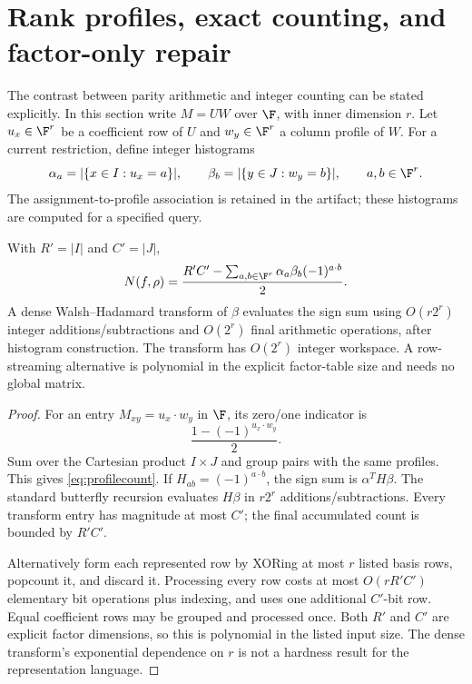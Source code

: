 \section{Rank profiles, exact counting, and factor-only repair}
\label{sec:profiles}
The contrast between parity arithmetic and integer counting can be stated explicitly. In this section write $M=UW$ over $\F$, with inner dimension $r$. Let $u_x\in\F^r$ be a coefficient row of $U$ and $w_y\in\F^r$ a column profile of $W$. For a current restriction, define integer histograms
\begin{equation}
 \alpha_a=|\{x\in I:u_x=a\}|,\qquad
 \beta_b=|\{y\in J:w_y=b\}|,\qquad a,b\in\F^r.
 \label{eq:profiles}
\end{equation}
The assignment-to-profile association is retained in the artifact; these histograms are computed for a specified query.

\begin{theorem}
\label{thm:profile}
With $R'=|I|$ and $C'=|J|$,
\begin{equation}
 N(f,\rho)=\frac{R'C'-\sum_{a,b\in\F^r}\alpha_a\beta_b(-1)^{a\cdot b}}{2}.
 \label{eq:profilecount}
\end{equation}
A dense Walsh--Hadamard transform of $\beta$ evaluates the sign sum using $O(r2^r)$ integer additions/subtractions and $O(2^r)$ final arithmetic operations, after histogram construction. The transform has $O(2^r)$ integer workspace. A row-streaming alternative is polynomial in the explicit factor-table size and needs no global matrix.
\end{theorem}
\begin{proof}
For an entry $M_{xy}=u_x\cdot w_y$ in $\F$, its zero/one indicator is
\[
 \frac{1-(-1)^{u_x\cdot w_y}}2.
\]
Sum over the Cartesian product $I\times J$ and group pairs with the same profiles. This gives \eqref{eq:profilecount}. If $H_{ab}=(-1)^{a\cdot b}$, the sign sum is $\alpha^T H\beta$. The standard butterfly recursion evaluates $H\beta$ in $r2^r$ additions/subtractions. Every transform entry has magnitude at most $C'$; the final accumulated count is bounded by $R'C'$.

Alternatively form each represented row by XORing at most $r$ listed basis rows, popcount it, and discard it. Processing every row costs at most $O(rR'C')$ elementary bit operations plus indexing, and uses one additional $C'$-bit row. Equal coefficient rows may be grouped and processed once. Both $R'$ and $C'$ are explicit factor dimensions, so this is polynomial in the listed input size. The dense transform's exponential dependence on $r$ is not a hardness result for the representation language.
\end{proof}

